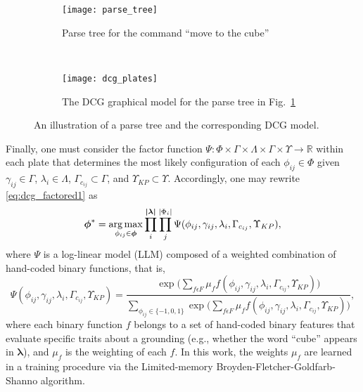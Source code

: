 \begin{figure}[b!]
\centering
\begin{subfigure}[b]{0.39\columnwidth}
\texttt{[image: parse\_tree]}
\caption{Parse tree for the command ``move to the cube''}
\label{fig:parse_tree}
\end{subfigure}
~
\begin{subfigure}[b]{0.55\columnwidth}
\centering
\texttt{[image: dcg\_plates]}
\caption{The DCG graphical model for the parse tree in Fig.~\ref{fig:parse_tree}}
\label{fig:dcg_plates}
\end{subfigure}
\caption{An illustration of a parse tree and the corresponding DCG model.}
\end{figure}

Finally, one must consider the factor function $\Psi : \Phi \times \Gamma \times \Lambda \times \Gamma \times \Upsilon \rightarrow
 \mathbb{R}$ within each plate that determines the most likely configuration of each $\phi_{ij} \in \Phi$ given $\gamma_{ij} \in \Gamma$, $\lambda_i \in \Lambda$, $\Gamma_{c_{ij}} \subset \Gamma$, and $\Upsilon_{KP} \subset \Upsilon$. Accordingly, one may rewrite \eqref{eq:dcg_factored1} as
\begin{equation}
\boldsymbol{\phi}^* = \operatorname*{\arg\max}_{\phi_{ij} \in \boldsymbol{\phi}} \prod_{i}^{\boldsymbol{|\lambda|}} \prod_{j}^{|\Phi_i|} \Psi(\phi_{ij},\gamma_{ij},\lambda_i,\Gamma_{c_{ij}},\Upsilon_{KP}),
\label{eq:llm1}
\end{equation}
where $\Psi$ is a log-linear model (LLM) composed of a weighted combination of hand-coded binary functions, that is,
\begin{equation}
\Psi(\phi_{ij},\gamma_{ij},\lambda_i,\Gamma_{c_{ij}},\Upsilon_{KP}) = \frac {\exp \Big( \sum\limits_{f \epsilon F} \mu_f f(\phi_{ij},\gamma_{ij},\lambda_i,\Gamma_{c_{ij}},\Upsilon_{KP}) \Big)}{\sum\limits_{\phi_{ij} \in \{-1,0,1\}}\exp \Big( \sum\limits_{f \epsilon F} \mu_f f(\phi_{ij},\gamma_{ij},\lambda_i,\Gamma_{c_{ij}},\Upsilon_{KP}) \Big)},
\label{eq:llm2}
\end{equation}
where each binary function $f$ belongs to a set of hand-coded binary features that evaluate specific traits about a grounding (e.g., whether the word ``cube'' appears in $\boldsymbol{\lambda}$), and $\mu_f$ is the weighting of each $f$. In this work,
the weights $\mu_f$ are learned in a training procedure via the Limited-memory Broyden-Fletcher-Goldfarb-Shanno algorithm.%